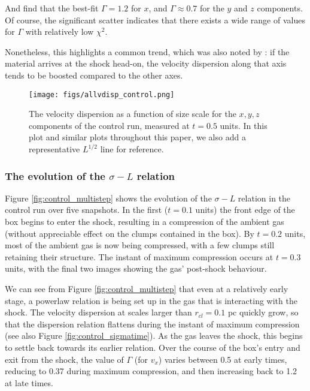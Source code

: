 \documentclass[a4paper,fleqn,usenatbib]{mnras}
\begin{document}
\noindent And find that the best-fit $\Gamma=1.2$ for $x$, and $\Gamma \approx 0.7$ for the $y$ and $z$ components.  Of course, the significant scatter indicates that there exists a wide range of values for $\Gamma$ with relatively low $\chi^2$.  

Nonetheless, this highlights a common trend, which was also noted by \citet{Dobbs2007}: if the material arrives at the shock head-on, the velocity dispersion along that axis tends to be boosted compared to the other axes.

\begin{figure}
\begin{center}
\texttt{[image: figs/allvdisp\_control.png]}
\end{center}
\caption{The velocity dispersion as a function of size scale for the $x,y,z$ components of the control run, measured at $t=0.5$ units.  In this plot and similar plots throughout this paper, we also add a representative $L^{1/2}$ line for reference. \label{fig:control_3vdisp}}
\end{figure}


\subsubsection{The evolution of the $\sigma-L$ relation}

\noindent Figure \ref{fig:control_multistep} shows the evolution of the $\sigma-L$ relation in the control run over five snapshots.  In the first ($t=0.1$ units) the front edge of the box begins to enter the shock, resulting in a compression of the ambient gas (without appreciable effect on the clumps contained in the box).  By $t=0.2$ units, most of the ambient gas is now being compressed, with a few clumps still retaining their structure.  The instant of maximum compression occurs at $t=0.3$ units, with the final two images showing the gas' post-shock behaviour. 

We can see from Figure \ref{fig:control_multistep} that even at a relatively early stage, a powerlaw relation is being set up in the gas that is interacting with the shock.  The velocity dispersion at scales larger than $r_{cl}=0.1$ pc quickly grow, so that the dispersion relation flattens during the instant of maximum compression (see also Figure \ref{fig:control_sigmatime}).  As the gas leaves the shock, this begins to settle back towards its earlier relation.  Over the course of the box's entry and exit from the shock, the value of $\Gamma$ (for $v_x$) varies between 0.5 at early times, reducing to 0.37 during maximum compression, and then increasing back to 1.2 at late times.  
\end{document}
